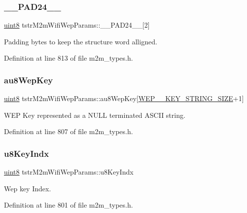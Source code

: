 \subsubsection{\texorpdfstring{\+\_\+\+\_\+\+P\+A\+D24\+\_\+\+\_\+}{\_\_PAD24\_\_}}
{\footnotesize\ttfamily \hyperlink{group__DataT_ga4df709a77647e870bbf1d955b8edc9a6}{uint8} tstr\+M2m\+Wifi\+Wep\+Params\+::\+\_\+\+\_\+\+P\+A\+D24\+\_\+\+\_\+\mbox{[}2\mbox{]}}

Padding bytes to keep the structure word alligned. 

Definition at line 813 of file m2m\+\_\+types.\+h.

\mbox{\label{structtstrM2mWifiWepParams_ad522f2c7dc7f4d974be95f6c8a705a13}} 
\subsubsection{\texorpdfstring{au8\+Wep\+Key}{au8WepKey}}
{\footnotesize\ttfamily \hyperlink{group__DataT_ga4df709a77647e870bbf1d955b8edc9a6}{uint8} tstr\+M2m\+Wifi\+Wep\+Params\+::au8\+Wep\+Key\mbox{[}\hyperlink{group__WlanDefines_ga087f8be759b11ec0fe841d21e60367f5}{W\+E\+P\+\_\+\_\+\+K\+E\+Y\+\_\+\+S\+T\+R\+I\+N\+G\+\_\+\+S\+I\+ZE}+1\mbox{]}}

W\+EP Key represented as a N\+U\+LL terminated A\+S\+C\+II string. 

Definition at line 807 of file m2m\+\_\+types.\+h.

\mbox{\label{structtstrM2mWifiWepParams_adfecc4478aca1ef7aa677c316e547a44}} 
\subsubsection{\texorpdfstring{u8\+Key\+Indx}{u8KeyIndx}}
{\footnotesize\ttfamily \hyperlink{group__DataT_ga4df709a77647e870bbf1d955b8edc9a6}{uint8} tstr\+M2m\+Wifi\+Wep\+Params\+::u8\+Key\+Indx}

Wep key Index. 

Definition at line 801 of file m2m\+\_\+types.\+h.

